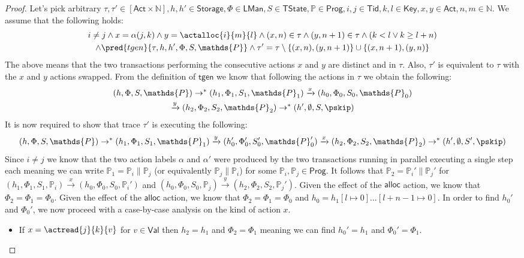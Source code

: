 \begin{proof}
Let's pick arbitrary $\tau, \tau' \in [\mathsf{Act} \times \mathds{N}], h, h' \in \mathsf{Storage}, \Phi \in \mathsf{LMan}, S \in \mathsf{TState}, \mathds{P} \in \mathsf{Prog}, i, j \in \mathsf{Tid}, k, l \in \mathsf{Key}, x, y \in \mathsf{Act}, n, m \in \mathds{N}$. We assume that the following holds:
\begin{gather*}
	i \neq j \land x = \alpha(j, k) \land y = \actalloc{i}{m}{l} \land (x, n) \in \tau \land (y, n+1) \in \tau \land (k < l \lor k \geq l + n) \\ \land \pred{tgen}{\tau, h, h', \Phi, S, \mathds{P}} \land \tau' = \tau \setminus \{(x, n), (y, n+1)\} \cup \{ (x, n+1), (y, n) \}
\end{gather*}
The above means that the two transactions performing the consecutive actions $x$ and $y$ are distinct and in $\tau$. Also, $\tau'$ is equivalent to $\tau$ with the $x$ and $y$ actions swapped. From the definition of $\mathsf{tgen}$ we know that following the actions in $\tau$ we obtain the following:
\begin{gather}
	\label{lem:ax1} (h, \Phi, S, \mathds{P}) \rightarrow^* (h_1, \Phi_1, S_1, \mathds{P}_1) \xrightarrow{x} (h_0, \Phi_0, S_0, \mathds{P}_0) \\
	\label{lem:ax2} \xrightarrow{y} (h_2, \Phi_2, S_2, \mathds{P}_2) \rightarrow^* (h', \emptyset, S, \pskip)
\end{gather}
It is now required to show that trace $\tau'$ is executing the following:
\[
	(h, \Phi, S, \mathds{P}) \rightarrow^* (h_1, \Phi_1, S_1, \mathds{P}_1) \xrightarrow{y} (h_0', \Phi_0', S_0', \mathds{P}_0') \xrightarrow{x} (h_2, \Phi_2, S_2, \mathds{P}_2) \rightarrow^* (h', \emptyset, S', \pskip)
\]
Since $i \neq j$ we know that the two action labels $\alpha$ and $\alpha'$ were produced by the two transactions running in parallel executing a single step each meaning we can write $\mathds{P}_1 = \mathds{P}_i \| \mathds{P}_j$ (or equivalently $\mathds{P}_j \| \mathds{P}_i$) for some $\mathds{P}_i, \mathds{P}_j \in \mathsf{Prog}$. It follows that $\mathds{P}_2 = \mathds{P}_i' \| \mathds{P}_j'$ for $(h_1, \Phi_1, S_1, \mathds{P}_i) \xrightarrow{x} (h_0, \Phi_0, S_0, \mathds{P}_i')$ and $(h_0, \Phi_0, S_0, \mathds{P}_j) \xrightarrow{y} (h_2, \Phi_2, S_2, \mathds{P}_j')$. Given the effect of the $\mathsf{alloc}$ action, we know that $\Phi_2 = \Phi_1 = \Phi_0$. Given the effect of the $\mathsf{alloc}$ action, we know that $\Phi_2 = \Phi_1 = \Phi_0$ and $h_0 = h_1[l \mapsto 0]\ldots[l + n - 1 \mapsto 0]$. In order to find $h_0'$ and $\Phi_0'$, we now proceed with a case-by-case analysis on the kind of action $x$.
\begin{itemize}
	\item If $x = \actread{j}{k}{v}$ for $v \in \mathsf{Val}$ then $h_2 = h_1$ and $\Phi_2 = \Phi_1$ meaning we can find $h_0' = h_1$ and $\Phi_0' = \Phi_1$.
	

\end{itemize}
\end{proof}

